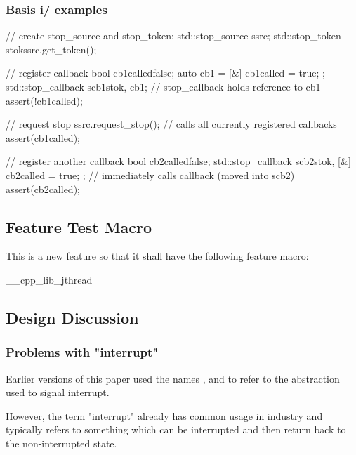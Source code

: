 \subsubsection*{Basis i/ examples}

\begin{codeblock}
// create stop_source and stop_token:
std::stop_source ssrc;
std::stop_token stok{ssrc.get_token()};

// register callback
bool cb1called{false};
auto cb1 = [&]{ cb1called = true; };
std::stop_callback scb1{stok, cb1};  // stop_callback holds reference to cb1
assert(!cb1called);

// request stop
ssrc.request_stop();                 // calls all currently registered callbacks
assert(cb1called);

// register another callback
bool cb2called{false};
std::stop_callback scb2{stok, 
                        [&]{ cb2called = true; }
                       };            // immediately calls callback (moved into scb2)
assert(cb2called);
\end{codeblock}

\subsection*{Feature Test Macro}

This is a new feature so that it shall have the following feature macro:
\begin{codeblock}
	__cpp_lib_jthread
\end{codeblock}



\subsection*{Design Discussion}

\subsubsection*{Problems with "interrupt"}

Earlier versions of this paper used the names ,
 and  to refer to the
abstraction used to signal interrupt.

However, the term "interrupt" already has common usage in industry and
typically refers to something which can be interrupted and then return
back to the non-interrupted state.

